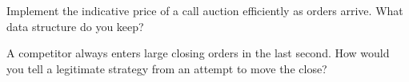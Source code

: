 \begin{interviewq}\label{iq:mx:auction-mechanics-and-theory:5}
Implement the indicative price of a call auction efficiently as orders arrive. What data structure do you keep?
\end{interviewq}

\begin{interviewq}\label{iq:mx:auction-mechanics-and-theory:6}
A competitor always enters large closing orders in the last second. How would you tell a legitimate strategy from an attempt to move the close?
\end{interviewq}
